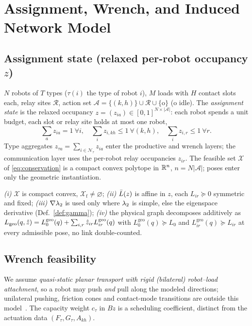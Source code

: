 \section{Assignment, Wrench, and Induced Network Model}
\label{sec:model}

\subsection{Assignment state (relaxed per-robot occupancy $z$)}
$N$ robots of $T$ types ($\tau(i)$ the type of robot $i$), $M$ loads with $H$ contact slots
each, relay sites $\mathcal R$, action set
$\mathcal A=\{(k,h)\}\cup\mathcal R\cup\{\mathrm o\}$ ($\mathrm o$ idle). The \emph{assignment
state} is the relaxed occupancy $z=(z_{ia})\in[0,1]^{N\times|\mathcal A|}$: each robot spends a
unit budget, each slot or relay site holds at most one robot,
\begin{equation}
\textstyle\sum_{a} z_{ia}=1\ \forall i,\quad
\sum_i z_{i,kh}\le1\ \forall(k,h),\quad \sum_i z_{i,r}\le1\ \forall r.
\label{eq:conservation}
\end{equation}
Type aggregates $z_{\tau a}=\sum_{i\in\mathcal N_\tau}z_{ia}$ enter the productive and wrench
layers; the communication layer uses the per-robot relay occupancies $z_{ir}$. The feasible set
$\mathcal X$ of \eqref{eq:conservation} is a compact convex polytope in $\mathbb{R}^{n}$,
$n=N|\mathcal A|$; poses enter only the geometric instantiation.

\begin{assumption}\label{as:standing}
\emph{(i)} $\mathcal X$ is compact convex, $\mathcal X_{\mathrm f}\neq\varnothing$;
\emph{(ii)} $\bar L(z)$ is affine in $z$, each $L_{ir}\succeq0$ symmetric and fixed;
\emph{(iii)} $\nabla\lambda_2$ is used only where $\lambda_2$ is simple, else the eigenspace
derivative (Def.~\ref{def:gamma}); \emph{(iv)} the physical graph decomposes additively as
$L_{\mathrm{geo}}(q,\hat z)=L_0^{\mathrm{geo}}(q)+\sum_{i,r}\hat z_{ir}L_{ir}^{\mathrm{geo}}(q)$ with
$L_0^{\mathrm{geo}}(q)\succeq L_0$ and $L_{ir}^{\mathrm{geo}}(q)\succeq L_{ir}$ at every
admissible pose, no link double-counted.
\end{assumption}

\subsection{Wrench feasibility}
We assume \emph{quasi-static planar transport with rigid (bilateral) robot--load attachment},
so a robot may push \emph{and} pull along the modeled directions; unilateral pushing, friction
cones and contact-mode transitions are outside this model~\cite{murray1994manipulation}. The
capacity weight $c_\tau$ in $Bz$ is a scheduling coefficient, distinct from the actuation data
$(F_\tau,G_\tau,A_{kh})$.

